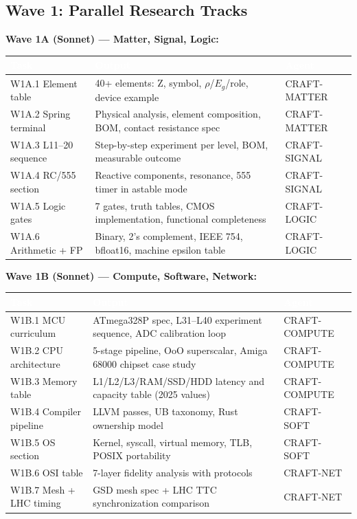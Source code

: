 \documentclass[11pt,letterpaper]{article}
\newcommand{\tableheader}[1]{\textbf{\sffamily\textcolor{white}{#1}}}
\begin{document}
\subsection{Wave 1: Parallel Research Tracks}

\textbf{Wave 1A (Sonnet) --- Matter, Signal, Logic:}
\begin{center}
\begin{tabularx}{\textwidth}{L{2.2cm}XL{2.2cm}}
\toprule
{}
\tableheader{Task} & \tableheader{Output} & \tableheader{Agent} \\
\midrule
W1A.1 Element table & 40+ elements: Z, symbol, $\rho$/$E_g$/role, device example & CRAFT-MATTER \\
W1A.2 Spring terminal & Physical analysis, element composition, BOM, contact resistance spec & CRAFT-MATTER \\
W1A.3 L11--20 sequence & Step-by-step experiment per level, BOM, measurable outcome & CRAFT-SIGNAL \\
W1A.4 RC/555 section & Reactive components, resonance, 555 timer in astable mode & CRAFT-SIGNAL \\
W1A.5 Logic gates & 7 gates, truth tables, CMOS implementation, functional completeness & CRAFT-LOGIC \\
W1A.6 Arithmetic + FP & Binary, 2's complement, IEEE 754, bfloat16, machine epsilon table & CRAFT-LOGIC \\
\bottomrule
\end{tabularx}
\end{center}

\textbf{Wave 1B (Sonnet) --- Compute, Software, Network:}
\begin{center}
\begin{tabularx}{\textwidth}{L{2.2cm}XL{2.2cm}}
\toprule
{}
\tableheader{Task} & \tableheader{Output} & \tableheader{Agent} \\
\midrule
W1B.1 MCU curriculum & ATmega328P spec, L31--L40 experiment sequence, ADC calibration loop & CRAFT-COMPUTE \\
W1B.2 CPU architecture & 5-stage pipeline, OoO superscalar, Amiga 68000 chipset case study & CRAFT-COMPUTE \\
W1B.3 Memory table & L1/L2/L3/RAM/SSD/HDD latency and capacity table (2025 values) & CRAFT-COMPUTE \\
W1B.4 Compiler pipeline & LLVM passes, UB taxonomy, Rust ownership model & CRAFT-SOFT \\
W1B.5 OS section & Kernel, syscall, virtual memory, TLB, POSIX portability & CRAFT-SOFT \\
W1B.6 OSI table & 7-layer fidelity analysis with protocols & CRAFT-NET \\
W1B.7 Mesh + LHC timing & GSD mesh spec + LHC TTC synchronization comparison & CRAFT-NET \\
\bottomrule
\end{tabularx}
\end{center}
\end{document}
